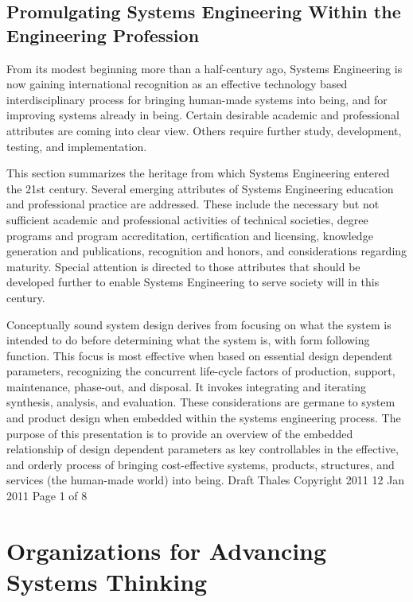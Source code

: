 \subsection{Promulgating Systems Engineering Within the Engineering Profession}

From its modest beginning more than a half-century ago, Systems Engineering is now gaining international recognition as an effective technology based interdisciplinary process for bringing human-made systems into being, and for improving systems already in being. Certain desirable academic and professional attributes are coming into clear view. Others require further study, development, testing, and implementation.

This section summarizes the heritage from which Systems Engineering entered the 21st century. Several emerging attributes of Systems Engineering education and professional practice are addressed. These include the necessary but not sufficient academic and professional activities of technical societies, degree programs and program accreditation, certification and licensing, knowledge generation and publications, recognition and honors, and considerations regarding maturity. Special attention is directed to those attributes that should be developed further to enable Systems Engineering to serve society will in this century.

Conceptually sound system design derives from focusing on what the system is intended to do before determining what the system is, with form following function. This focus is most effective when based on essential design dependent parameters, recognizing the concurrent life-cycle factors of production, support, maintenance, phase-out, and disposal. It invokes integrating and iterating synthesis, analysis, and evaluation. These considerations are germane to system and product design when embedded within the systems engineering process. The purpose of this presentation is to provide an overview of the embedded relationship of design dependent parameters as key controllables in the effective, and orderly process of bringing cost-effective systems, products, structures, and services (the human-made world) into being.  Draft Thales Copyright 2011 12 Jan 2011 Page 1 of 8
    

\section{Organizations for Advancing Systems Thinking}

